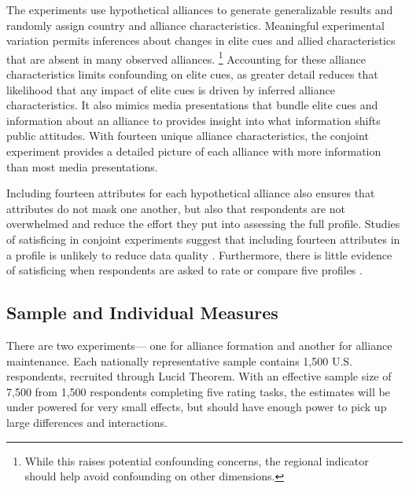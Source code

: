 \documentclass[12pt]{article}
\begin{document}
The experiments use hypothetical alliances to generate generalizable results and randomly assign country and alliance characteristics. 
Meaningful experimental variation permits inferences about changes in elite cues and allied characteristics that are absent in many observed alliances. \footnote{While this raises potential confounding concerns, the regional indicator should help avoid confounding on other dimensions.}
Accounting for these alliance characteristics limits confounding on elite cues, as greater detail reduces that likelihood that any impact of elite cues is driven by inferred alliance characteristics.
It also mimics media presentations that bundle elite cues and information about an alliance to provides insight into what information shifts public attitudes. 
With fourteen unique alliance characteristics, the conjoint experiment provides a detailed picture of each alliance with more information than most media presentations.


Including fourteen attributes for each hypothetical alliance also ensures that attributes do not mask one another, but also that respondents are not overwhelmed and reduce the effort they put into assessing the full profile.
Studies of satisficing in conjoint experiments suggest that including fourteen attributes in a profile is unlikely to reduce data quality \citep{Bansaketal2019}. 
Furthermore, there is little evidence of satisficing when respondents are asked to rate or compare five profiles \citep{Bansaketal2018}.



\subsection{Sample and Individual Measures}


There are two experiments--- one for alliance formation and another for alliance maintenance. 
Each nationally representative sample contains 1,500 U.S. respondents, recruited through Lucid Theorem.
With an effective sample size of 7,500 from 1,500 respondents completing five rating tasks, the estimates will be under powered for very small effects, but should have enough power to pick up large differences and interactions. 
\end{document}
